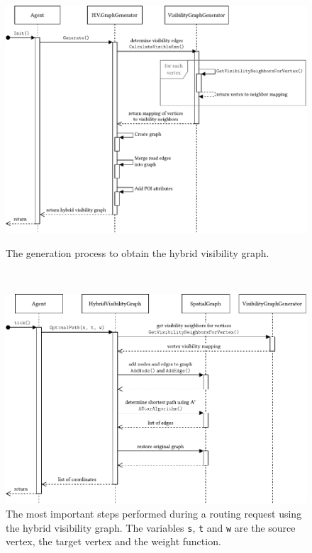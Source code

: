 	\begin{figure}[h]
		\begin{figcenter}
			\includegraphics[scale=0.8]{images/components-sequence-generation.pdf}
		\end{figcenter}
		\caption[Sequence-diagram of hybrid visibility graph generation.]{The generation process to obtain the hybrid visibility graph.}
		\label{fig:components-sequence-generate}
		\hfill
		\\
		\begin{figcenter}
			\includegraphics[scale=0.8]{images/components-sequence-routing.pdf}
		\end{figcenter}
		\caption[Sequence-diagram of routing queries.]{The most important steps performed during a routing request using the hybrid visibility graph. The variables \texttt{s}, \texttt{t} and \texttt{w} are the source vertex, the target vertex and the weight function.}
		\label{fig:components-sequence-routing}
	\end{figure}
	
